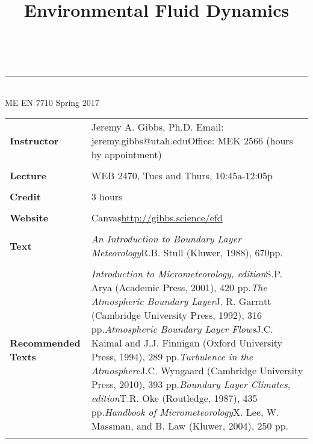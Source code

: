 \documentclass[11pt]{article}
\makeatletter
\newcommand{\linia}{\rule{\linewidth}{0.5pt}}
\theoremstyle{mytheor}
\renewcommand{\maketitle}{
\begin{center}
\vspace{2ex}
{\huge \textsc{\@title}}
\vspace{1ex}
\\
\linia\\
ME EN 7710 \hfill Spring 2017
\vspace{4ex}
\end{center}
}
\makeatother
\begin{document}
\title{Environmental Fluid Dynamics}

\maketitle


\begin{table}[H]
  \begin{tabularx}{\textwidth}{l Y}
  \textbf{Instructor} & Jeremy A. Gibbs, Ph.D. \newline Email: jeremy.gibbs@utah.edu\newline Office: MEK 2566 (hours by appointment) \\\\
  \textbf{Lecture} & WEB 2470, Tues and Thurs, 10:45a-12:05p\\\\
  \textbf{Credit} & 3 hours\\\\
  \textbf{Website} & Canvas\newline\href{http://gibbs.science/efd}{http://gibbs.science/efd}\\\\
  \textbf{Text} & \emph{An Introduction to Boundary Layer Meteorology}\newline R.B. Stull (Kluwer, 1988), 670pp.\\\\
  \textbf{Recommended Texts} & \emph{Introduction to Micrometeorology,  edition}\newline S.P. Arya (Academic Press, 2001), 420 pp.\newline\vspace{10pt}\emph{The Atmospheric Boundary Layer}\newline J. R. Garratt (Cambridge University Press, 1992), 316 pp.\newline\vspace{10pt}\emph{Atmospheric Boundary Layer Flows}\newline J.C. Kaimal and J.J. Finnigan (Oxford University Press, 1994), 289 pp.\newline\vspace{10pt}\emph{Turbulence in the Atmosphere}\newline J.C. Wyngaard (Cambridge University Press, 2010), 393 pp.\newline\vspace{10pt}\emph{Boundary Layer Climates,  edition}\newline T.R. Oke (Routledge, 1987), 435 pp.\newline\vspace{10pt}\emph{Handbook of Micrometeorology}\newline X. Lee, W. Massman, and B. Law (Kluwer, 2004), 250 pp.\\\\

\end{tabularx}
\end{table}
\end{document}
